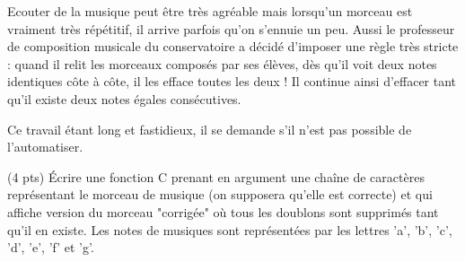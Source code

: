 


Ecouter de la musique peut être très agréable mais lorsqu'un morceau
est vraiment très répétitif, il arrive parfois qu'on s'ennuie un
peu. Aussi le professeur de composition musicale du conservatoire a
décidé d'imposer une règle très stricte : quand il relit les morceaux
composés par ses élèves, dès qu'il voit deux notes identiques côte à
côte, il les efface toutes les deux ! Il continue ainsi d'effacer tant
qu'il existe deux notes égales consécutives.

Ce travail étant long et fastidieux, il se demande s'il n'est pas
possible de l'automatiser.


\question (4 pts) Écrire une fonction C prenant en argument une chaîne
de caractères représentant le morceau de musique (on supposera qu'elle
est correcte) et qui affiche version du morceau "corrigée" où tous les
doublons sont supprimés tant qu'il en existe. Les notes de musiques
sont représentées par les lettres 'a', 'b', 'c', 'd', 'e', 'f' et 'g'.
